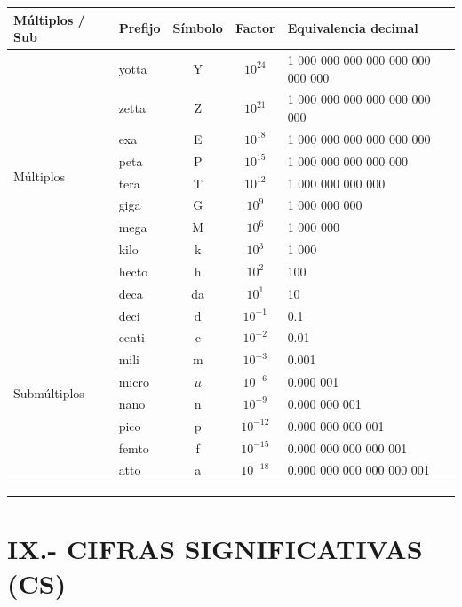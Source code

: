 \documentclass[12pt,a4paper]{article}
\begin{document}
\begin{table}[h!]
\centering
\begin{tabular}{|l|l|c|c|l|}
\hline
\textbf{Múltiplos / Sub} & \textbf{Prefijo} & \textbf{Símbolo} & \textbf{Factor} & \textbf{Equivalencia decimal} \\ \hline
\multirow{10}{*}{Múltiplos} 
& yotta & Y & $10^{24}$ & 1 000 000 000 000 000 000 000 000 \\ \cline{2-5}
& zetta & Z & $10^{21}$ & 1 000 000 000 000 000 000 000 \\ \cline{2-5}
& exa & E & $10^{18}$ & 1 000 000 000 000 000 000 \\ \cline{2-5}
& peta & P & $10^{15}$ & 1 000 000 000 000 000 \\ \cline{2-5}
& tera & T & $10^{12}$ & 1 000 000 000 000 \\ \cline{2-5}
& giga & G & $10^{9}$ & 1 000 000 000 \\ \cline{2-5}
& mega & M & $10^{6}$ & 1 000 000 \\ \cline{2-5}
& kilo & k & $10^{3}$ & 1 000 \\ \cline{2-5}
& hecto & h & $10^{2}$ & 100 \\ \cline{2-5}
& deca & da & $10^{1}$ & 10 \\ \hline
\multirow{8}{*}{Submúltiplos} 
& deci & d & $10^{-1}$ & 0.1 \\ \cline{2-5}
& centi & c & $10^{-2}$ & 0.01 \\ \cline{2-5}
& mili & m & $10^{-3}$ & 0.001 \\ \cline{2-5}
& micro & $\mu$ & $10^{-6}$ & 0.000 001 \\ \cline{2-5}
& nano & n & $10^{-9}$ & 0.000 000 001 \\ \cline{2-5}
& pico & p & $10^{-12}$ & 0.000 000 000 001 \\ \cline{2-5}
& femto & f & $10^{-15}$ & 0.000 000 000 000 001 \\ \cline{2-5}
& atto & a & $10^{-18}$ & 0.000 000 000 000 000 001 \\ \hline
\end{tabular}
\end{table}

\vspace{0.5cm}
\hrule
\vspace{0.5cm}

\section{IX.- CIFRAS SIGNIFICATIVAS (CS)}
\end{document}
